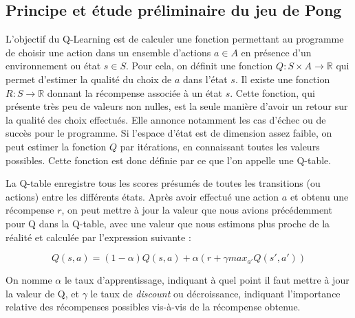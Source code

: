 \documentclass[
    10pt,
    a4paper,
    oneside,
    headinclude,footinclude,
    BCOR=5mm,
    captions=tableabove
]{scrartcl}
\begin{document}
\subsection{Principe et étude préliminaire du jeu de Pong}
L'objectif du Q-Learning est de calculer une fonction permettant au programme de choisir une action dans un ensemble d'actions $a \in A$ en présence d'un environnement ou état $s \in S$. Pour cela, on définit une fonction $Q: S \times A \rightarrow \mathbb{R}$ qui permet d'estimer la qualité du choix de $a$ dans l'état $s$. Il existe une fonction $R: S \rightarrow \mathbb{R}$ donnant la récompense associée à un état $s$. Cette fonction, qui présente très peu de valeurs non nulles, est la seule manière d'avoir un retour sur la qualité des choix effectués. Elle annonce notamment les cas d'échec ou de succès pour le programme. Si l'espace d'état est de dimension assez faible, on peut estimer la fonction $Q$ par itérations, en connaissant toutes les valeurs possibles. Cette fonction est donc définie par ce que l'on appelle une Q-table.

La Q-table enregistre tous les scores présumés de toutes les transitions (ou actions) entre les différents états. Après avoir effectué une action $a$ et obtenu une récompense $r$, on peut mettre à jour la valeur que nous avions précédemment pour Q dans la Q-table, avec une valeur que nous estimons plus proche de la réalité et calculée par l'expression suivante :

$$Q(s,a) = (1-\alpha) Q(s,a) + \alpha (r + \gamma max_{a'} Q(s',a') )$$

On nomme $\alpha$ le taux d'apprentissage, indiquant à quel point il faut mettre à jour la valeur de Q, et $\gamma$ le taux de \textit{discount} ou décroissance, indiquant l'importance relative des récompenses possibles vis-à-vis de la récompense obtenue.
\end{document}
